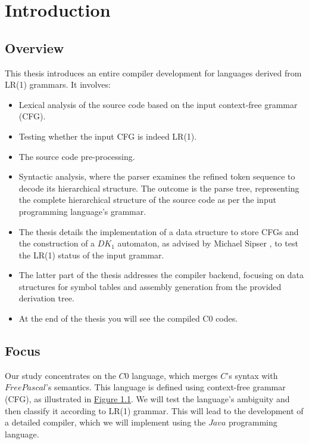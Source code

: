 \chapter{Introduction}\label{ch:Introduction}

\section*{Overview}
This thesis introduces an entire compiler development for languages derived from LR(1) grammars. It involves:

\begin{itemize}
    \item Lexical analysis of the source code based on the input context-free grammar (CFG).
    \item Testing whether the input CFG is indeed LR(1).
    \item The source code pre-processing.
    \item Syntactic analysis, where the parser examines the refined token sequence to decode its hierarchical structure. The outcome is the parse tree, representing the complete hierarchical structure of the source code as per the input programming language's grammar.
    \item The thesis details the implementation of a data structure to store CFGs and the construction of a \({DK_{1}}\) automaton, as advised by Michael Sipser \cite{sipser}, to test the LR(1) status of the input grammar.
    \item The latter part of the thesis addresses the compiler backend, focusing on data structures for symbol tables and assembly generation from the provided derivation tree.
    \item At the end of the thesis you will see the compiled C0 codes.
\end{itemize}

\section*{Focus}
Our study concentrates on the \(C0\) language, which merges \(C\)'s syntax with \(Free Pascal\)'s semantics. This language is defined using context-free grammar (CFG), as illustrated in \hyperref[fig:grammar_c0]{Figure 1.1}. We will test the language's ambiguity and then classify it according to LR(1) grammar. This will lead to the development of a detailed compiler, which we will implement using the \(Java\) programming language.

